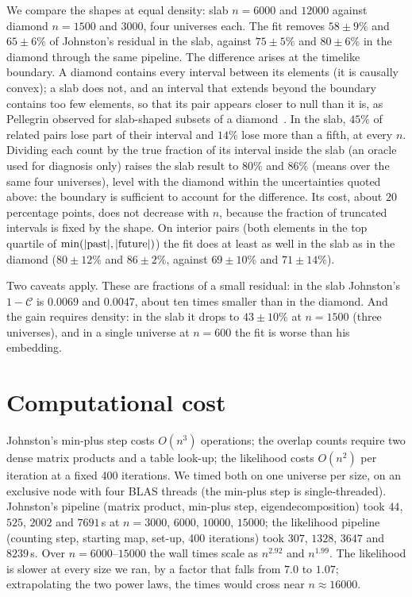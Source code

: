 \documentclass[prd,twocolumn,superscriptaddress,nofootinbib,amsmath,amssymb,floatfix]{revtex4-2}
\begin{document}
We compare the shapes at equal density: slab $n=6000$ and $12000$ against diamond $n=1500$ and $3000$, four universes each. The fit removes $58\pm9\%$ and $65\pm6\%$ of Johnston's residual in the slab, against $75\pm5\%$ and $80\pm6\%$ in the diamond through the same pipeline. The difference arises at the timelike boundary. A diamond contains every interval between its elements (it is causally convex); a slab does not, and an interval that extends beyond the boundary contains too few elements, so that its pair appears closer to null than it is, as Pellegrin observed for slab-shaped subsets of a diamond~\cite{Pellegrin26}. In the slab, $45\%$ of related pairs lose part of their interval and $14\%$ lose more than a fifth, at every $n$. Dividing each count by the true fraction of its interval inside the slab (an oracle used for diagnosis only) raises the slab result to $80\%$ and $86\%$ (means over the same four universes), level with the diamond within the uncertainties quoted above: the boundary is sufficient to account for the difference. Its cost, about $20$ percentage points, does not decrease with $n$, because the fraction of truncated intervals is fixed by the shape. On interior pairs (both elements in the top quartile of $\min(|{\rm past}|,|{\rm future}|)$) the fit does at least as well in the slab as in the diamond ($80\pm12\%$ and $86\pm2\%$, against $69\pm10\%$ and $71\pm14\%$).

Two caveats apply. These are fractions of a small residual: in the slab Johnston's $1-\mathcal C$ is $0.0069$ and $0.0047$, about ten times smaller than in the diamond. And the gain requires density: in the slab it drops to $43\pm10\%$ at $n=1500$ (three universes), and in a single universe at $n=600$ the fit is worse than his embedding.

\section{Computational cost}\label{sec:cost}
Johnston's min-plus step costs $O(n^3)$ operations; the overlap counts require two dense matrix products and a table look-up; the likelihood costs $O(n^2)$ per iteration at a fixed 400 iterations. We timed both on one universe per size, on an exclusive node with four BLAS threads (the min-plus step is single-threaded). Johnston's pipeline (matrix product, min-plus step, eigendecomposition) took $44$, $525$, $2002$ and $7691$\,s at $n=3000$, $6000$, $10000$, $15000$; the likelihood pipeline (counting step, starting map, set-up, 400 iterations) took $307$, $1328$, $3647$ and $8239$\,s. Over $n=6000$--$15000$ the wall times scale as $n^{2.92}$ and $n^{1.99}$. The likelihood is slower at every size we ran, by a factor that falls from $7.0$ to $1.07$; extrapolating the two power laws, the times would cross near $n\approx16000$.
\end{document}

